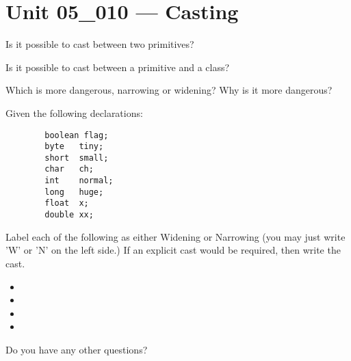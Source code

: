 \documentclass[letterpaper,12pt]{exam}
\newcommand{\unit}{Unit 05}
\begin{document}
\section*{\unit\_010 --- Casting} %

\begin{questions}
\begin{samepage}
    \question Is it possible to cast between two primitives?
    \vspace{5mm}
\end{samepage}


\begin{samepage}
    \question Is it possible to cast between a primitive and a class?  
    \vspace{5mm}
\end{samepage}

\begin{samepage}
    \question Which is more dangerous, narrowing or widening?  Why is it more dangerous?
    \vspace{5mm}
\end{samepage}

\begin{samepage}
    
    \question Given the following declarations:
    \begin{verbatim}
        boolean flag;  
        byte   tiny;   
        short  small;  
        char   ch;     
        int    normal; 
        long   huge;   
        float  x;      
        double xx;     
      \end{verbatim}

      Label each of the following as either Widening or Narrowing (you may just write 'W' or 'N' on the left side.)  If an explicit cast would be required, then write the cast.
    \begin{itemize}
        \item {}
        \vspace{5mm}
        \item {}
        \vspace{5mm}
        \item {}
        \vspace{5mm}
        \item {}
        \vspace{5mm}
       \end{itemize}
\end{samepage}


\begin{samepage}
	\question Do you have any other questions?
	\vspace{30mm}
\end{samepage}

\end{questions}
\end{document}
